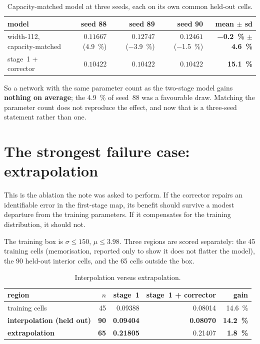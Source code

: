 ﻿\documentclass[11pt,a4paper]{article}
\begin{document}
\begin{table}[h]
\centering\small
\begin{tabular}{@{}lrrrr@{}}
\toprule
model & seed 88 & seed 89 & seed 90 & mean $\pm$ sd \\
\midrule
width-112, capacity-matched & $0.11667$ (\SI{4.9}{\percent}) & $0.12747$ (\SI{-3.9}{\percent}) &
  $0.12461$ (\SI{-1.5}{\percent}) & \textbf{\SI{-0.2}{\percent} $\pm$ \SI{4.6}{\percent}} \\
stage~1 + corrector & $0.10422$ & $0.10422$ & $0.10422$ & \textbf{\SI{15.1}{\percent}} \\
\bottomrule
\end{tabular}
\caption{Capacity-matched model at three seeds, each on its own common held-out cells.}
\end{table}

So a network with the same parameter count as the two-stage model gains \textbf{nothing on
average}; the \SI{4.9}{\percent} of seed~88 was a favourable draw. Matching the parameter count does
not reproduce the effect, and now that is a three-seed statement rather than one.

\section{The strongest failure case: extrapolation}
\label{sec:failure}

This is the ablation the note was asked to perform. If the corrector repairs an identifiable error
in the first-stage map, its benefit should survive a modest departure from the training parameters.
If it compensates for the training distribution, it should not.

The training box is $\sigma\le150$, $\mu\le3.98$. Three regions are scored separately: the 45
training cells (memorisation, reported only to show it does not flatter the model), the 90 held-out
interior cells, and the 65 cells outside the box.

\begin{table}[h]
\centering\small
\begin{tabular}{@{}lrrrr@{}}
\toprule
region & $n$ & stage~1 & stage~1 + corrector & gain \\
\midrule
training cells & 45 & 0.09388 & 0.08014 & \SI{14.6}{\percent} \\
\textbf{interpolation (held out)} & \textbf{90} & \textbf{0.09404} & \textbf{0.08070} &
  \textbf{\SI{14.2}{\percent}} \\
\textbf{extrapolation} & \textbf{65} & \textbf{0.21805} & 0.21407 & \textbf{\SI{1.8}{\percent}} \\
\bottomrule
\end{tabular}
\caption{Interpolation versus extrapolation.}
\label{tab:regions}
\end{table}
\end{document}
